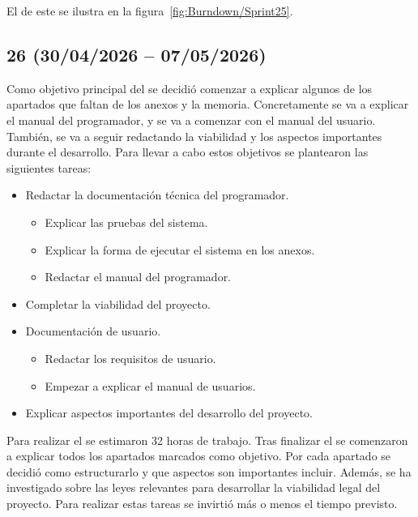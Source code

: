 El  de este  se ilustra en la figura~\ref{fig:Burndown/Sprint25}.

\subsection{ 26 (30/04/2026 -- 07/05/2026)}
Como objetivo principal del  se decidió comenzar a explicar algunos de los apartados que faltan de los anexos y la memoria. Concretamente se va a explicar el manual del programador, y se va a comenzar con el manual del usuario. También, se va a seguir redactando la viabilidad y los aspectos importantes durante el desarrollo. Para llevar a cabo estos objetivos se plantearon las siguientes tareas:

\begin{itemize}
\tightlist
	\item Redactar la documentación técnica del programador.
	\begin{itemize}
	\tightlist
		\item Explicar las pruebas del sistema.
		\item Explicar la forma de ejecutar el sistema en los anexos.
		\item Redactar el manual del programador.
	\end{itemize}
	\item Completar la viabilidad del proyecto.
	\item Documentación de usuario.
	\begin{itemize}
	\tightlist
		\item Redactar los requisitos de usuario.
		\item Empezar a explicar el manual de usuarios.
	\end{itemize}
	\item Explicar aspectos importantes del desarrollo del proyecto.
\end{itemize}

Para realizar el  se estimaron 32 horas de trabajo. Tras finalizar el  se comenzaron a explicar todos los apartados marcados como objetivo. Por cada apartado se decidió como estructurarlo y que aspectos son importantes incluir. Además, se ha investigado sobre las leyes relevantes para desarrollar la viabilidad legal del proyecto. Para realizar estas tareas se invirtió más o menos el tiempo previsto.

